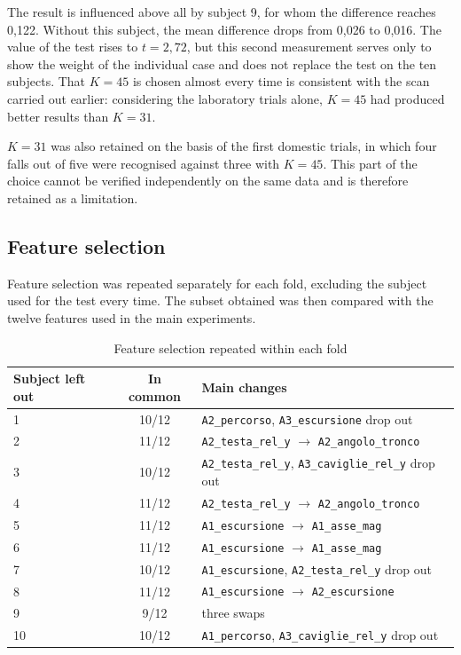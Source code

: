 The result is influenced above all by subject 9, for whom the difference reaches 0,122. Without this subject, the mean difference drops from 0,026 to 0,016. The value of the test rises to $t=2{,}72$, but this second measurement serves only to show the weight of the individual case and does not replace the test on the ten subjects.
That $K=45$ is chosen almost every time is consistent with the scan carried out earlier: considering the laboratory trials alone, $K=45$ had produced better results than $K=31$.

$K=31$ was also retained on the basis of the first domestic trials, in which four falls out of five were recognised against three with $K=45$.
This part of the choice cannot be verified independently on the same data and is therefore retained as a limitation.

\subsection{Feature selection}
Feature selection was repeated separately for each fold, excluding the subject used for the test every time. The subset obtained was then compared with the twelve features used in the main experiments.

\begin{table}[htbp]
\centering
\caption{Feature selection repeated within each fold}
\label{tab:leakage_misura}
\small
\begin{tabularx}{\textwidth}{@{}l c X@{}}
\toprule
\textbf{Subject left out} & \textbf{In common} & \textbf{Main changes} \\
\midrule
1 & 10/12 & \texttt{A2\_percorso}, \texttt{A3\_escursione} drop out \\
2 & 11/12 & \texttt{A2\_testa\_rel\_y} $\rightarrow$ \texttt{A2\_angolo\_tronco} \\
3 & 10/12 & \texttt{A2\_testa\_rel\_y}, \texttt{A3\_caviglie\_rel\_y} drop out
\\ 4 & 11/12 & \texttt{A2\_testa\_rel\_y} $\rightarrow$ \texttt{A2\_angolo\_tronco}
\\ 5 & 11/12 & \texttt{A1\_escursione} $\rightarrow$ \texttt{A1\_asse\_mag}
\\ 6 & 11/12 & \texttt{A1\_escursione} $\rightarrow$ \texttt{A1\_asse\_mag}
\\ 7 & 10/12 & \texttt{A1\_escursione}, \texttt{A2\_testa\_rel\_y} drop out
\\ 8 & 11/12 & \texttt{A1\_escursione} $\rightarrow$ \texttt{A2\_escursione}
\\ 9 & 9/12 & three swaps
\\ 10 & 10/12 & \texttt{A1\_percorso}, \texttt{A3\_caviglie\_rel\_y} drop out
\\
\bottomrule
\end{tabularx}
\end{table}

